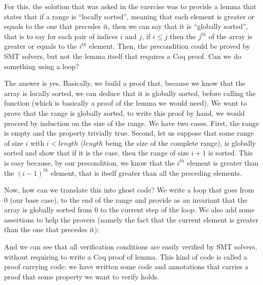 


For this, the solution that was asked in the exercise was to provide a lemma
that states that if a range is ``locally sorted'', meaning that each element
is greater or equals to the one that precedes it, then we can say that it is
``globally sorted'', that is to say for each pair of indices $i$ and $j$, if
$i \leq j$ then the $j^{th}$ of the array is greater or equals to the $i^{th}$
element. Then, the precondition could be proved by SMT solvers, but not the
lemma itself that requires a Coq proof. Can we do something using a loop?



The answer is yes. Basically, we build a proof that, because we know that the
array is locally sorted, we can deduce that it is globally sorted, before
calling the function (which is basically a proof of the lemma we would need).
We want to prove that the range is globally sorted, to write this proof by hand,
we would proceed by induction on the size of the range. We have two cases.
First, the range is empty and the property trivially true. Second, let us suppose
that some range of size $i$ with $i < length$ ($length$ being the size of the
complete range), is globally sorted and show that if it is the case, then the
range of size $i+1$ is sorted. This is easy because, by our precondition, we
know that the $i^{th}$ element is greater than the $(i-1)^{th}$ element, that is
itself greater than all the preceding elements.




Now, how can we translate this into ghost code? We write a loop that goes from
$0$ (our base case), to the end of the range  and provide as an
invariant that the array is globally sorted from $0$ to the current step of the
loop. We also add some assertions to help the provers (namely the fact that the
current element is greater than the one that precedes it):






And we can see that all verification conditions are easily verified by SMT
solvers, without requiring to write a Coq proof of lemma. This kind of code is
called a proof carrying code: we have written some code and annotations that
carries a proof that some property we want to verify holds.



